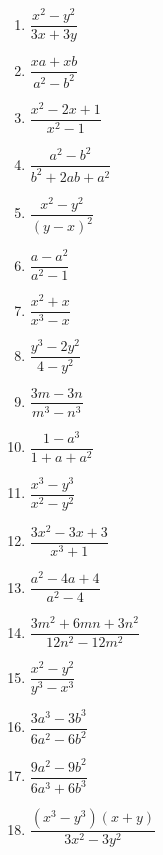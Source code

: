 \documentclass[10pt, a4paper]{article}
\begin{document}
\begin{enumerate}
\begin{multicols}{3}
\begin{enumerate}
			\item $\dfrac{x^2-y^2}{3x+3y}$ 
			\item $\dfrac{xa+xb}{a^2-b^2}$ 
			\item $\dfrac{x^2-2x+1}{x^2-1}$ 
			\item $\dfrac{a^2-b^2}{b^2+2ab+a^2}$ 
			\item $\dfrac{x^2-y^2}{(y-x)^2}$ 
			\item $\dfrac{a-a^2}{a^2-1}$ 
			\item $\dfrac{x^2+x}{x^3-x}$ 
			\item $\dfrac{y^3-2y^2}{4-y^2}$ 
			\item $\dfrac{3m-3n}{m^3-n^3}$ 
			\item $\dfrac{1-a^3}{1+a+a^2}$ 
			\item $\dfrac{x^3-y^3}{x^2-y^2}$ 
			\item $\dfrac{3x^2-3x+3}{x^3+1}$ 
			\item $\dfrac{a^2-4a+4}{a^2-4}$ 
			\item $\dfrac{3m^2+6mn+3n^2}{12n^2-12m^2}$ 
			\item $\dfrac{x^2-y^2}{y^3-x^3}$ 
			\item $\dfrac{3a^3-3b^3}{6a^2-6b^2}$ 
			\item $\dfrac{9a^2-9b^2}{6a^3+6b^3}$ 
			\item $\dfrac{(x^3-y^3)(x+y)}{3x^2-3y^2}$ 
		\end{enumerate}	
	\end{multicols}
\end{enumerate}	
\end{document}
